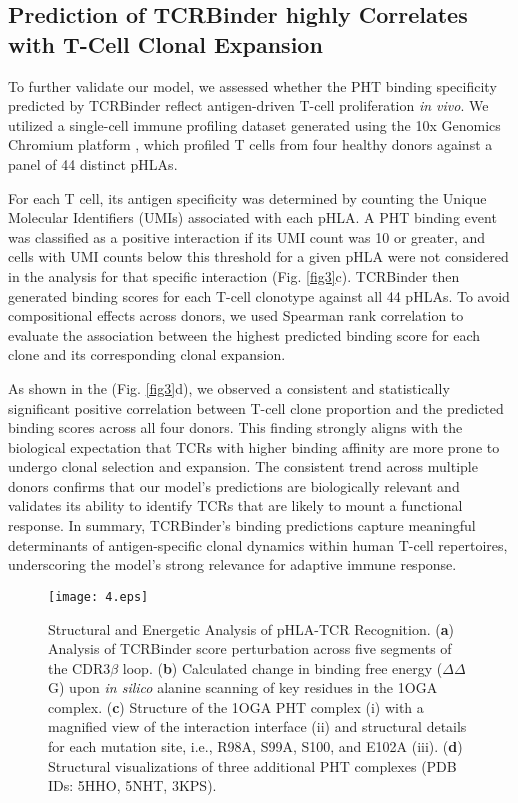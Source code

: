 \documentclass[10pt,letterpaper]{article}
\begin{document}
\subsection*{Prediction of TCRBinder highly Correlates with T-Cell Clonal Expansion}

To further validate our model, we assessed whether the PHT binding specificity predicted by TCRBinder reflect antigen-driven T-cell proliferation \textit{in vivo}. We utilized a single-cell immune profiling dataset generated using the 10x Genomics Chromium platform \cite{ref42}, which profiled T cells from four healthy donors against a panel of 44 distinct pHLAs.

For each T cell, its antigen specificity was determined by counting the Unique Molecular Identifiers (UMIs) associated with each pHLA. A PHT binding event was classified as a positive interaction if its UMI count was 10 or greater, and cells with UMI counts below this threshold for a given pHLA were not considered in the analysis for that specific interaction (Fig. \ref{fig3}c). TCRBinder then generated binding scores for each T-cell clonotype against all 44 pHLAs. To avoid compositional effects across donors, we used Spearman rank correlation to evaluate the association between the highest predicted binding score for each clone and its corresponding clonal expansion.


As shown in the (Fig. \ref{fig3}d), we observed a consistent and statistically significant positive correlation between T-cell clone proportion and the predicted binding scores across all four donors. This finding strongly aligns with the biological expectation that TCRs with higher binding affinity are more prone to undergo clonal selection and expansion. The consistent trend across multiple donors confirms that our model's predictions are biologically relevant and validates its ability to identify TCRs that are likely to mount a functional response. In summary, TCRBinder's binding predictions capture meaningful determinants of antigen-specific clonal dynamics within human T-cell repertoires, underscoring the model's strong relevance for adaptive immune response.

\begin{figure}[!h]
    \texttt{[image: 4.eps]}
    \caption{Structural and Energetic Analysis of pHLA-TCR Recognition. (\textbf{a}) Analysis of TCRBinder score perturbation across five segments of the CDR3$\beta$ loop. (\textbf{b}) Calculated change in binding free energy ($\Delta$$\Delta$G) upon \textit{in silico} alanine scanning of key residues in the 1OGA complex. (\textbf{c}) Structure of the 1OGA PHT complex (i) with a magnified view of the interaction interface (ii) and structural details for each mutation site, i.e., R98A, S99A, S100, and E102A (iii). (\textbf{d}) Structural visualizations of three additional PHT complexes (PDB IDs: 5HHO, 5NHT, 3KPS).}
\label{fig4}
\end{figure}
\end{document}
